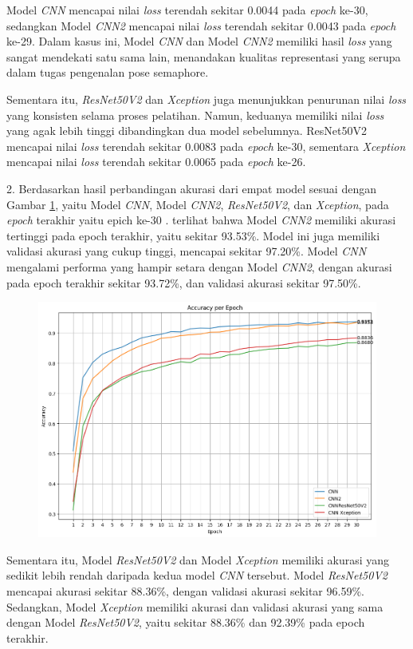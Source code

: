 Model \textit{CNN} mencapai nilai \textit{loss} terendah sekitar 0.0044 pada \textit{epoch} ke-30, sedangkan Model \textit{CNN2} mencapai nilai \textit{loss} terendah sekitar 0.0043 pada \textit{epoch} ke-29. Dalam kasus ini, Model \textit{CNN} dan Model \textit{CNN2} memiliki hasil \textit{loss} yang sangat mendekati satu sama lain, menandakan kualitas representasi yang serupa dalam tugas pengenalan pose semaphore.

Sementara itu, \textit{ResNet50V2} dan \textit{Xception} juga menunjukkan penurunan nilai \textit{loss} yang konsisten selama proses pelatihan. Namun, keduanya memiliki nilai \textit{loss} yang agak lebih tinggi dibandingkan dua model sebelumnya. ResNet50V2 mencapai nilai \textit{loss} terendah sekitar 0.0083 pada \textit{epoch} ke-30, sementara \textit{Xception} mencapai nilai \textit{loss} terendah sekitar 0.0065 pada \textit{epoch} ke-26.

2. Berdasarkan hasil perbandingan akurasi dari empat model sesuai dengan Gambar \ref{fig:GrafikPerbandinganAkurasi}, yaitu Model \textit{CNN}, Model \textit{CNN2}, \textit{ResNet50V2}, dan \textit{Xception}, pada \textit{epoch} terakhir yaitu epich ke-30 . terlihat bahwa Model \textit{CNN2} memiliki akurasi tertinggi pada epoch terakhir, yaitu sekitar 93.53\%. Model ini juga memiliki validasi akurasi yang cukup tinggi, mencapai sekitar 97.20\%. Model \textit{CNN} mengalami performa yang hampir setara dengan Model \textit{CNN2}, dengan akurasi pada epoch terakhir sekitar 93.72\%, dan validasi akurasi sekitar 97.50\%.
\begin{figure}[!hbt]
	\centering
	\includegraphics[width=0.7\linewidth]{gambar/bener/Perbandingan_AkurasiCNN.png}
	\label{fig:GrafikPerbandinganAkurasi}
\end{figure}
Sementara itu, Model \textit{ResNet50V2} dan Model \textit{Xception} memiliki akurasi yang sedikit lebih rendah daripada kedua model \textit{CNN} tersebut. Model \textit{ResNet50V2} mencapai akurasi sekitar 88.36\%, dengan validasi akurasi sekitar 96.59\%. Sedangkan, Model \textit{Xception} memiliki akurasi dan validasi akurasi yang sama dengan Model \textit{ResNet50V2}, yaitu sekitar 88.36\% dan 92.39\% pada epoch terakhir.

